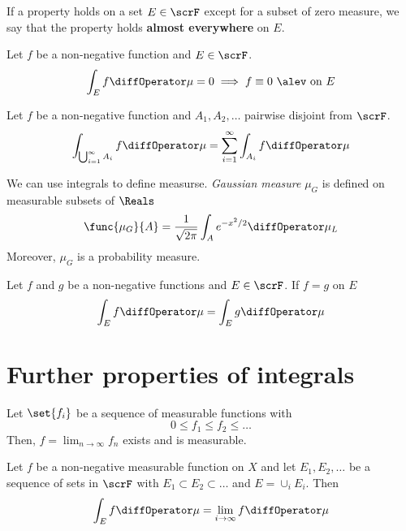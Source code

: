 \begin{definition}
    If a property holds on a set \(E \in \scrF\) except for a subset of zero measure, we say that the property holds \textbf{almost everywhere} on \(E\).
\end{definition}

\begin{corollary}
    Let \(f\) be a non-negative function and \(E \in \scrF\). 
    \begin{equation*}
        \int_E f \diffOperator \mu = 0 \implies f \equiv 0 \mathrm{\ \alev \ on \ } E
    \end{equation*}
\end{corollary}

\begin{theorem}
    Let \(f\) be a non-negative function and \(A_1, A_2, \dots \) pairwise disjoint from \(\scrF\). 
    \begin{equation*}
        \int_{\bigcup_{i = 1}^{\infty} A_i} f \diffOperator \mu = \sum_{i= 1}^{\infty} \int_{A_i} f \diffOperator \mu 
    \end{equation*}
\end{theorem}

We can use integrals to define measurse. \textit{Gaussian measure} \(\mu_G\) is defined on measurable subsets of \(\Reals\)
\begin{equation*}
    \func{\mu_G}{A} = \dfrac{1}{\sqrt{2\pi}} \int_{A} e^{-x^2/2} \diffOperator\mu_L
\end{equation*}
Moreover, \(\mu_G\) is a probability measure. 

\begin{corollary}
    Let \(f\) and \(g\) be a non-negative functions and \(E \in \scrF\). If \(f = g\) \alev on \(E\)
    \begin{equation*}
        \int_E f \diffOperator \mu = \int_E g \diffOperator \mu 
    \end{equation*}
\end{corollary}

\section{Further properties of integrals}
Let \(\set{f_i}\) be a sequence of measurable functions with 
\begin{equation*}
    0 \leq f_1 \leq f_2 \leq \dots 
\end{equation*}
Then, \(f = \lim_{n \to \infty} f_n\) exists and is measurable. 
\begin{lemma}
    Let \(f\) be a non-negative measurable function on \(X\) and let \(E_1, E_2,\dots \) be a sequence of sets in \(\scrF\) with \(E_1 \subset E_2 \subset \dots\) and \(E = \cup_i E_i\). Then 
    \begin{equation*}
        \int_E f \diffOperator \mu = \lim_{i \to \infty} f \diffOperator \mu 
    \end{equation*}
\end{lemma}

